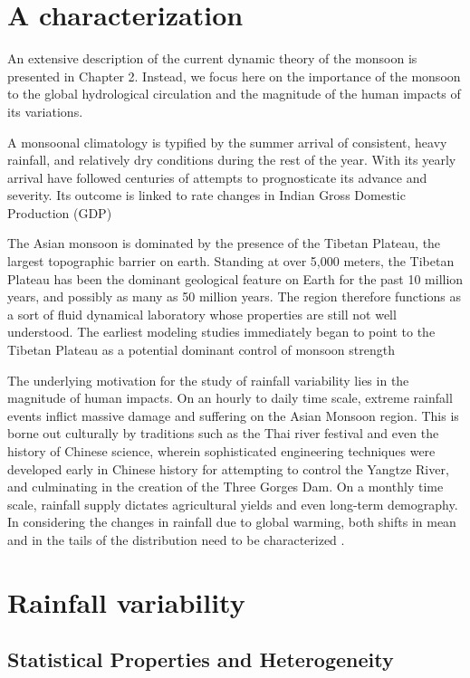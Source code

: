 \section{A characterization}

An extensive description of the current dynamic theory of the monsoon is presented in Chapter 2. Instead, we focus here on the importance of the monsoon to the global hydrological circulation and the magnitude of the human impacts of its variations.

A monsoonal climatology is typified by the summer arrival of consistent, heavy rainfall, and relatively dry conditions during the rest of the year. With its yearly arrival have followed centuries of attempts to prognosticate its advance and severity. Its outcome is linked to rate changes in Indian Gross Domestic Production (GDP) \citep{Gadgil}

The Asian monsoon is dominated by the presence of the Tibetan Plateau, the largest topographic barrier on earth. Standing at over 5,000 meters, the Tibetan Plateau has been the dominant geological feature on Earth for the past 10 million years, and possibly as many as 50 million years. The region therefore functions as a sort of fluid dynamical laboratory whose properties are still not well understood. The earliest modeling studies immediately began to point to the Tibetan Plateau as a potential dominant control of monsoon strength \cite{Manabe}

The underlying motivation for the study of rainfall variability lies in the magnitude of human impacts. On an hourly to daily time scale, extreme rainfall events inflict massive damage and suffering on the Asian Monsoon region. This is borne out culturally by traditions such as the Thai river festival and even the history of Chinese science, wherein sophisticated engineering techniques were developed early in Chinese history for attempting to control the Yangtze River, and culminating in the creation of the Three Gorges Dam. On a monthly time scale, rainfall supply dictates agricultural yields and even long-term demography. In considering the changes in rainfall due to global warming, both shifts in mean and in the tails of the distribution need to be characterized \cite{Pendergrass}.


\section{Rainfall variability}

\subsection{Statistical Properties and Heterogeneity}

